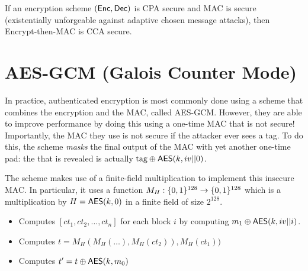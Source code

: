 \begin{theorem}
	If an encryption scheme $(\mathsf{Enc}, \mathsf{Dec})$ is CPA secure and MAC is secure (existentially unforgeable against adaptive chosen message attacks), then Encrypt-then-MAC is CCA secure.	
\end{theorem}

\section{AES-GCM (Galois Counter Mode)}
In practice, authenticated encryption is most commonly done using a scheme that combines the encryption and the MAC, called AES-GCM. However, they are able to improve performance by doing this using a one-time MAC that is not secure! Importantly, the MAC they use is not secure if the attacker ever sees a tag. To do this, the scheme \emph{masks} the final output of the MAC with yet another one-time pad: the  that is revealed is actually $\text{tag} \oplus \mathsf{AES}(k, iv || 0)$.

The scheme makes use of a finite-field multiplication to implement this insecure MAC. In particular, it uses a function $M_H: \{0,1\}^{128} \rightarrow \{0,1\}^{128}$ which is a multiplication by $H = \mathsf{AES}(k, 0)$ in a finite field of size $2^{128}$.
\begin{itemize}
	\item Computes $[ct_1, ct_2, \ldots, ct_n]$ for each block $i$ by computing $m_1 \oplus \mathsf{AES}(k, iv || i)$.
	\item Computes $t = M_H(M_H(\ldots), M_H(ct_2)), M_H(ct_1))$
	\item Computes $t' = t \oplus \mathsf{AES}(k, m_0)$

\end{itemize}
